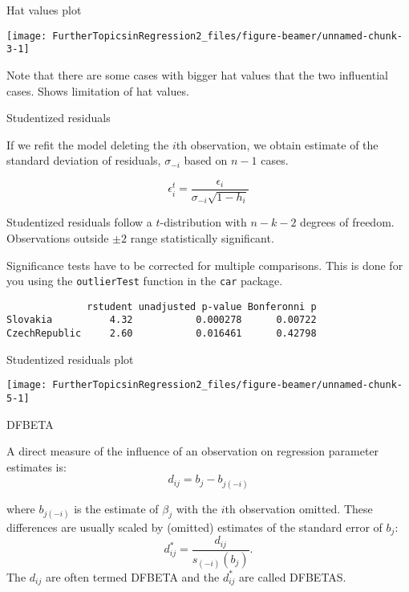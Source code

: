 \documentclass[10pt,ignorenonframetext,]{beamer}
\begin{document}
\begin{frame}{Hat values plot}

\begin{center}\texttt{[image: FurtherTopicsinRegression2\_files/figure-beamer/unnamed-chunk-3-1]} \end{center}

\footnotesize
Note that there are some cases with bigger hat values that the two
influential cases. Shows limitation of hat values.

\end{frame}

\begin{frame}[fragile]{Studentized residuals}

If we refit the model deleting the \(i\)th observation, we obtain
estimate of the standard deviation of residuals, \(\sigma_{-i}\) based
on \(n-1\) cases.

\[
\epsilon_i^t = \frac{\epsilon_i}{\sigma_{-i} \sqrt{1-h_i}}
\]

Studentized residuals follow a \(t\)-distribution with \(n-k-2\) degrees
of freedom. Observations outside \(\pm 2\) range statistically
significant.

Significance tests have to be corrected for multiple comparisons. This
is done for you using the \texttt{outlierTest} function in the
\texttt{car} package.

\scriptsize

\begin{verbatim}
              rstudent unadjusted p-value Bonferonni p
Slovakia          4.32           0.000278      0.00722
CzechRepublic     2.60           0.016461      0.42798
\end{verbatim}

\end{frame}

\begin{frame}{Studentized residuals plot}

\begin{center}\texttt{[image: FurtherTopicsinRegression2\_files/figure-beamer/unnamed-chunk-5-1]} \end{center}

\end{frame}

\begin{frame}{DFBETA}

A direct measure of the influence of an observation on regression
parameter estimates is: \[
d_{ij} = b_j - b_{j(-i)}
\]

where \(b_{j(-i)}\) is the estimate of \(\beta_j\) with the \(i\)th
observation omitted. These differences are usually scaled by (omitted)
estimates of the standard error of \(b_j\): \[
d_{ij}^* = \frac{d_{ij}}{s_{(-i)}(b_j)}.
\] The \(d_{ij}\) are often termed DFBETA and the \(d_{ij}^*\) are
called DFBETAS.

\end{frame}
\end{document}
